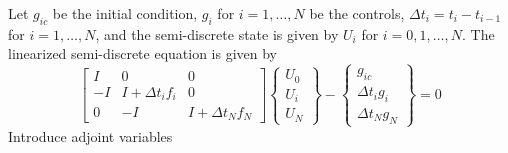 \documentclass[10pt]{article}
\begin{document}
Let $g_{ic}$ be the initial condition, $g_i$ for $i=1,\dots,N$ be the
controls, $\Delta t_i = t_i - t_{i-1}$ for $i=1,\dots,N$, and the
semi-discrete state is given by $U_i$ for $i=0,1,\dots,N$.  The linearized
semi-discrete equation is given by
\begin{equation}
\left[ \begin{array}{ccc} 
I & 0 & 0 \\
-I & I + \Delta t_i f_i & 0 \\
0 & -I & I + \Delta t_N f_N
\end{array} \right] 
\left\{\begin{array}{c} U_0 \\ U_i \\ U_N \end{array} \right\} -
\left\{\begin{array}{c} 
g_{ic} \\ \Delta t_i g_i \\ \Delta t_N g_N\end{array} \right\} = 0 
\end{equation}
%
Introduce adjoint variables
\end{document}
